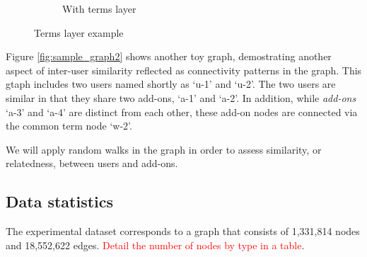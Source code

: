 \documentclass[11pt,oneside]{book}
\let\Oldsubsection\subsection
\renewcommand{\subsection}{\FloatBarrier\Oldsubsection}
\begin{document}
\begin{figure}[h]
\begin{subfigure}[b]{0.49\textwidth}
	\caption{With terms layer}
\end{subfigure}
	\caption{Terms layer example}
	\label{fig:terms_layer}
\end{figure}
  
Figure \ref{fig:sample_graph2} shows another toy graph, demostrating another aspect of inter-user similarity reflected as connectivity patterns in the graph. This gtaph includes two users named shortly as `u-1' and `u-2'. The two users are similar in that they share two add-ons, `a-1' and `a-2'. In addition, while {\it add-ons} `a-3' and `a-4' are distinct from each other, these add-on nodes are connected via the common term node `w-2'. 

We will apply random walks in the graph in order to assess similarity, or relatedness, between users and add-ons.  

\subsection{Data statistics}

The experimental dataset corresponds to a graph that consists of 1,331,814 nodes and 18,552,622
edges. \textcolor{red}{Detail the number of nodes by type in a table}. 
\end{document}
